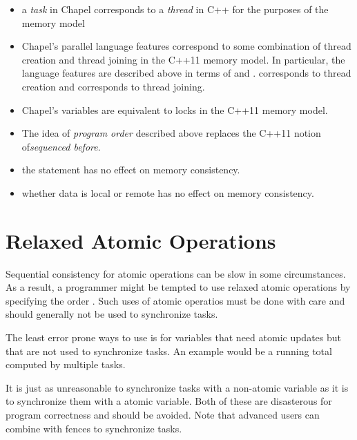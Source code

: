 \begin{itemize}

  \item a \textit{task} in Chapel corresponds to a \textit{thread} in C++
  for the purposes of the memory model

  \item Chapel's parallel language features correspond to some combination of
  thread creation and thread joining in the C++11 memory model. In particular,
  the language features are described above in terms of  and
  .  corresponds to thread creation and 
  corresponds to thread joining.

  \item Chapel's  variables are equivalent to locks in the
  C++11 memory model.

  \item The idea of \textit{program order} described above replaces the
  C++11 notion of\textit{sequenced before}.

  \item the  statement has no effect on memory consistency.

  \item whether data is local or remote has no effect on memory consistency.

\end{itemize}

\section{Relaxed Atomic Operations}

Sequential consistency for atomic operations can be slow in some
circumstances. As a result, a programmer might be tempted to use relaxed
atomic operations by specifying the order .
Such uses of atomic operatios must be done with care and should generally
not be used to synchronize tasks.

The least error prone ways to use  is for
variables that need atomic updates but that are not used to synchronize
tasks. An example would be a running total computed by multiple tasks.

It is just as unreasonable to synchronize tasks with a non-atomic variable
as it is to synchronize them with a  atomic
variable. Both of these are disasterous for program correctness and should
be avoided. Note that advanced users can combine
 with fences to synchronize tasks.

